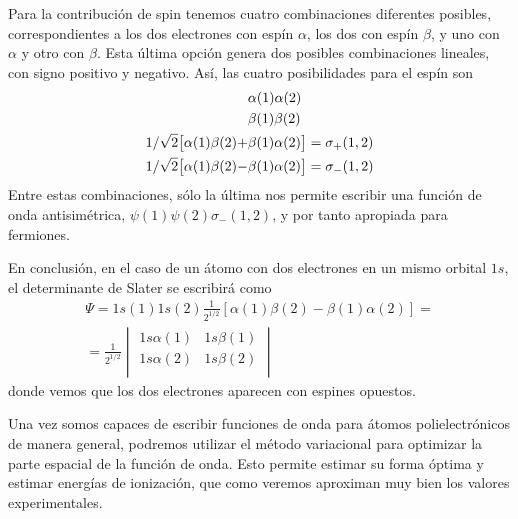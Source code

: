 \documentclass{tufte-handout}
\begin{document}
Para la contribución de spin tenemos cuatro combinaciones 
diferentes posibles, correspondientes a los dos electrones 
con espín $\alpha$, los dos con espín $\beta$, y uno con 
$\alpha$ y otro con $\beta$. Esta última opción genera
dos posibles combinaciones lineales, con signo positivo y 
negativo. Así, las cuatro posibilidades para el espín son
\begin{align*}
\small
    &\alpha(1)\alpha(2) \\
    &\beta(1)\beta(2) \\
    1/\sqrt{2}\big[\alpha(1)\beta(2)+&\beta(1)\alpha(2)\big] = \sigma_{+}(1,2)\\
    1/\sqrt{2}\big[\alpha(1)\beta(2)-&\beta(1)\alpha(2)\big] = \sigma_{-}(1,2)
\end{align*}
Entre estas combinaciones, sólo la última nos permite escribir una función de onda antisimétrica, $\psi(1)\psi(2)\sigma_{-}(1,2)$, y por
tanto apropiada para fermiones. 

En conclusión, en el caso de un átomo con dos electrones en 
un mismo orbital $1s$, el determinante de Slater se escribirá
como
\begin{equation}
\begin{split}
    \Psi = 1s(1)1s(2)\frac{1}{2^{1/2}}[\alpha(1)\beta(2)-\beta(1)\alpha(2)] = \\
=    \frac{1}{2^{1/2}}
    \begin{vmatrix} 
    1s\alpha(1) & 1s\beta(1)   \\
    1s\alpha(2) & 1s\beta(2)  \\
    \end{vmatrix}
    \end{split}
    \label{eq:fundamental}
\end{equation}
donde vemos que los dos electrones aparecen con espines opuestos. 

Una vez somos capaces de escribir funciones de onda para
átomos polielectrónicos de manera general, podremos
utilizar el método variacional para optimizar la 
parte espacial de la función de onda. Esto permite 
estimar su forma óptima y estimar energías de ionización,
que como veremos aproximan muy bien los valores
experimentales.
\end{document}
